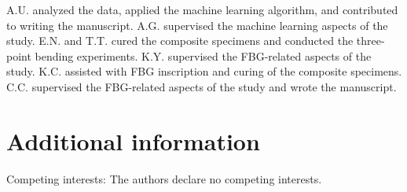 \documentclass[fleqn,10pt]{wlscirep}
\begin{document}
A.U. analyzed the data, applied the machine learning algorithm, and contributed to writing the manuscript. A.G. supervised the machine learning aspects of the study. E.N. and T.T. cured the composite specimens and conducted the three-point bending experiments. K.Y. supervised the FBG-related aspects of the study. K.C. assisted with FBG inscription and curing of the composite specimens. C.C. supervised the FBG-related aspects of the study and wrote the manuscript.

\section*{Additional information}

Competing interests: The authors declare no competing interests.
\end{document}
